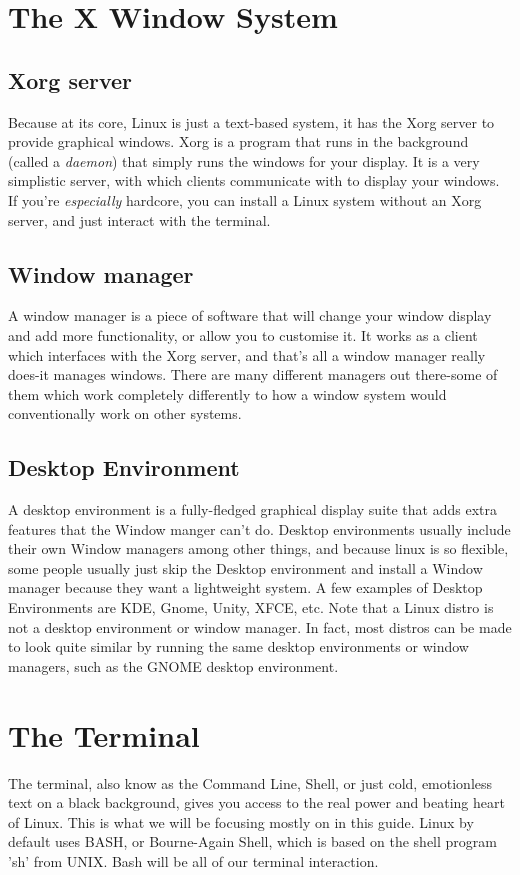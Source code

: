 \documentclass{article}
\begin{document}
\section{The X Window System}

\subsection{Xorg server}
Because at its core, Linux is just a text-based system, it has the Xorg server to provide graphical windows. Xorg is a program that runs in the background (called a \emph{daemon}) that simply runs the windows for your display. It is a very simplistic server, with which clients communicate with to display your windows. If you're \emph{especially} hardcore, you can install a Linux system without an Xorg server, and just interact with the terminal. 

\subsection{Window manager}
A window manager is a piece of software that will change your window display and add more functionality, or allow you to customise it. It works as a client which interfaces with the Xorg server, and that's all a window manager really does-it manages windows. There are many different managers out there-some of them which work completely differently to how a window system would conventionally work on other systems.

\subsection{Desktop Environment}
A desktop environment is a fully-fledged graphical display suite that adds extra features that the Window manger can't do.  Desktop environments usually include their own Window managers among other things, and because linux is so flexible, some people usually just skip the Desktop environment and install a Window manager because they want a lightweight system. A few examples of Desktop Environments are KDE, Gnome, Unity, XFCE, etc. Note that a Linux distro is not a desktop environment or window manager. In fact, most distros can be made to look quite similar by running the same desktop environments or window managers, such as the GNOME desktop environment.

\section{The Terminal}
The terminal, also know as the Command Line, Shell, or just cold, emotionless text on a black background, gives you access to the real power and beating heart of Linux. This is what we will be focusing mostly on in this guide. Linux by default uses BASH, or Bourne-Again Shell, which is based on the shell program 'sh' from UNIX. Bash will be all of our terminal interaction. 
\end{document}

